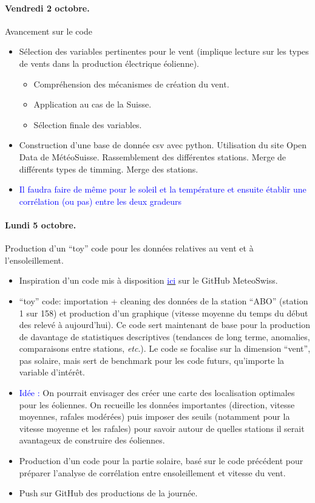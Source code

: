 \documentclass[11pt, a4paper]{article}
\begin{document}
\paragraph{Vendredi 2 octobre.} Avancement sur le code
\begin{itemize}
    \item Sélection des variables pertinentes pour le vent (implique lecture sur les types de vents dans la production électrique éolienne).
    \begin{itemize}
        \item Compréhension des mécanismes de création du vent.
        \item Application au cas de la Suisse.
        \item Sélection finale des variables.
    \end{itemize}
    \item Construction d'une base de donnée csv avec python. Utilisation du site Open Data de MétéoSuisse. Rassemblement des différentes stations. Merge de différents types de timming. Merge des stations.
    \item \textcolor{blue}{Il faudra faire de même pour le soleil et la température et ensuite établir une corrélation (ou pas) entre les deux gradeurs}
\end{itemize}

\paragraph{Lundi 5 octobre.} Production d'un ``toy'' code pour les données relatives au vent et à l'ensoleillement. 
\begin{itemize}
    \item Inspiration d'un code mis à disposition \href{https://github.com/MeteoSwiss/opendata/blob/main/notebooks/MonthlyMeanGlobalRadiation_HAI.ipynb}{\textcolor{blue}{ici}} sur le GitHub MeteoSwiss. 
    \item ``toy'' code: importation + cleaning des données de la station ``ABO'' (station 1 sur 158) et production d'un graphique (vitesse moyenne du temps du début des relevé à aujourd'hui). Ce code sert maintenant de base pour la production de davantage de statistiques descriptives (tendances de long terme, anomalies, comparaisons entre stations, \textit{etc}.). Le code se focalise sur la dimension ``vent'', pas solaire, mais sert de benchmark pour les code futurs, qu'importe la variable d'intérêt. 
    \item \textcolor{blue}{Idée :} On pourrait envisager des créer une carte des localisation optimales pour les éoliennes. On recueille les données importantes (direction, vitesse moyennes, rafales modérées) puis imposer des seuils (notamment pour la vitesse moyenne et les rafales) pour savoir autour de quelles stations il serait avantageux de construire des éoliennes.
    \item Production d'un code pour la partie solaire, basé sur le code précédent pour préparer l'analyse de corrélation entre ensoleillement et vitesse du vent.
    \item Push sur GitHub des productions de la journée.
\end{itemize}
\end{document}

